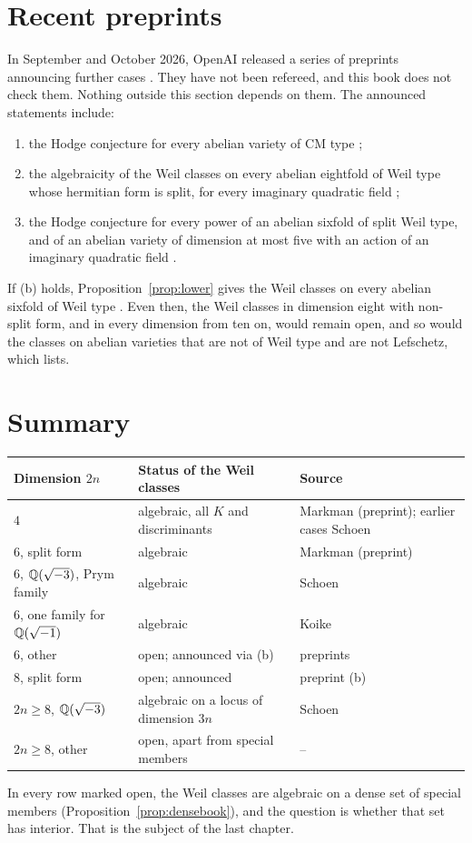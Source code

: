\section{Recent preprints}\label{sec:preprintsbook}

In September and October 2026, OpenAI released a series of preprints
announcing further cases \cite{OAI26d,OAI26e,OAI26g}. They have not been
refereed, and this book does not check them. Nothing outside this section
depends on them. The announced statements include:
\begin{enumerate}[label=(\alph*)]
\item the Hodge conjecture for every abelian variety of CM type
\cite{OAI26e};
\item the algebraicity of the Weil classes on every abelian eightfold of
Weil type whose hermitian form is split, for every imaginary quadratic
field \cite{OAI26d};
\item the Hodge conjecture for every power of an abelian sixfold of split
Weil type, and of an abelian variety of dimension at most five with an
action of an imaginary quadratic field \cite{OAI26g}.
\end{enumerate}
If (b) holds, Proposition~\ref{prop:lower} gives the Weil classes on every
abelian sixfold of Weil type \cite{BhH8}. Even then, the Weil classes in
dimension eight with non-split form, and in every dimension from ten on,
would remain open, and so would the classes on abelian varieties that are
not of Weil type and are not Lefschetz, which \cite{BhH8} lists.

\section{Summary}

\begin{center}
\begin{tabular}{@{}>{\raggedright\arraybackslash}p{3.6cm}>{\raggedright\arraybackslash}p{5.2cm}>{\raggedright\arraybackslash}p{5.0cm}@{}}
\toprule
Dimension $2n$ & Status of the Weil classes & Source\\
\midrule
$4$ & algebraic, all $K$ and discriminants & Markman (preprint); earlier cases Schoen\\
$6$, split form & algebraic & Markman (preprint)\\
$6$, $\mathbb{Q}(\sqrt{-3})$, Prym family & algebraic & Schoen\\
$6$, one family for $\mathbb{Q}(\sqrt{-1})$ & algebraic & Koike\\
$6$, other & open; announced via (b) & preprints\\
$8$, split form & open; announced & preprint (b)\\
$2n\ge8$, $\mathbb{Q}(\sqrt{-3})$ & algebraic on a locus of dimension $3n$ & Schoen\\
$2n\ge8$, other & open, apart from special members & --\\
\bottomrule
\end{tabular}
\end{center}

In every row marked open, the Weil classes are algebraic on a dense set of
special members (Proposition~\ref{prop:densebook}), and the question is
whether that set has interior. That is the subject of the last chapter.
